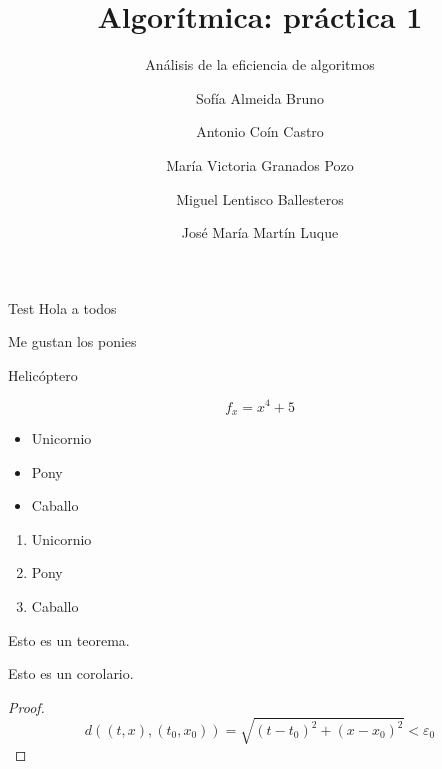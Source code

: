 \documentclass[spanish]{beamer}
\title{Algorítmica: práctica 1}
\subtitle{Análisis de la eficiencia de algoritmos}
\author{Sofía Almeida Bruno \and Antonio Coín Castro \and María Victoria Granados Pozo \and Miguel Lentisco Ballesteros \and José María Martín Luque}
\begin{document}


\maketitle

\begin{frame}{Test}
	Hola a todos
	
	Me gustan los ponies
	
	Helicóptero
	
	$$ f_x = x^4+5$$
\end{frame}

\begin{frame}
	\begin{itemize}
		\item Unicornio
		\item Pony
		\item Caballo
	\end{itemize}
\end{frame}

\begin{frame}
	\begin{enumerate}
		\item Unicornio
		\item Pony
		\item Caballo
	\end{enumerate}
\end{frame}

\begin{frame}
	\begin{theorem}
		Esto es un teorema.
	\end{theorem}
	\begin{corollary}
		Esto es un corolario.
	\end{corollary}
	\begin{proof}
		$$d((t, x), (t_0, x_0)) = \sqrt{(t-t_0)^2 + (x-x_0)^2} < \varepsilon_0$$
	\end{proof}
\end{frame}
\end{document}
